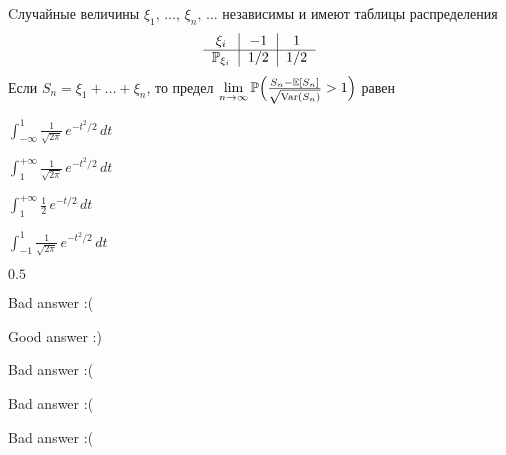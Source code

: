 
\begin{question}
Cлучайные величины \(\xi_1, \, \ldots, \, \xi_n, \, \ldots\) независимы
и имеют таблицы распределения \[
\begin{tabular}{c|c|c}
$\xi_i$                     & $-1$   & $1$   \\ \cline{1-3}
$\P_{\xi_i}$        & $1/2$       & $1/2$   \\
\end{tabular}
\] Если \(S_n = \xi_1 + \ldots + \xi_n\), то предел
\(\lim\limits_{n \rightarrow \infty}\operatorname{\mathbb{P}}\Bigl(\frac{S_n - \operatorname{\mathbb{E}}[S_n]}{\sqrt{\operatorname{Var}(S_n)}} > 1\Bigr)\)
равен
\begin{answerlist}
  \item \(\int_{-\infty}^{1}\frac{1}{\sqrt{2\pi}}\,e^{-t^2/2}\,dt\)
  \item \(\int_{1}^{+\infty}\frac{1}{\sqrt{2\pi}}\,e^{-t^2/2}\,dt\)
  \item \(\int_{1}^{+\infty}\frac{1}{2}\,e^{-t/2}\,dt\)
  \item \(\int_{-1}^{1}\frac{1}{\sqrt{2\pi}}\,e^{-t^2/2}\,dt\)
  \item \(0.5\)
\end{answerlist}
\end{question}

\begin{solution}
\begin{answerlist}
  \item Bad answer :(
  \item Good answer :)
  \item Bad answer :(
  \item Bad answer :(
  \item Bad answer :(
\end{answerlist}
\end{solution}

